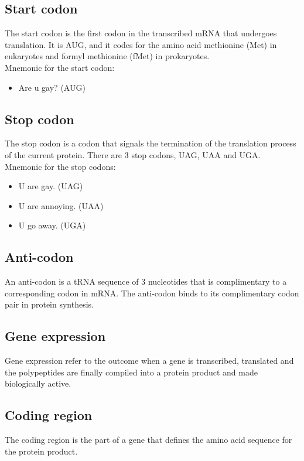 \documentclass[11pt]{article}
\begin{document}
\subsection{Start codon}
\label{sec:orga14edbb}
The start codon is the first codon in the transcribed mRNA that undergoes translation. It is AUG, and it codes for the amino acid methionine (Met) in eukaryotes and formyl methionine (fMet) in prokaryotes.
\\[0pt]

Mnemonic for the start codon:
\begin{itemize}
\item Are u gay? (AUG)
\end{itemize}

\subsection{Stop codon}
\label{sec:org535173b}
The stop codon is a codon that signals the termination of the translation process of the current protein. There are 3 stop codons, UAG, UAA and UGA.
\\[0pt]

Mnemonic for the stop codons:
\begin{itemize}
\item U are gay. (UAG)
\item U are annoying. (UAA)
\item U go away. (UGA)
\end{itemize}

\subsection{Anti-codon}
\label{sec:org271460f}
An anti-codon is a tRNA sequence of 3 nucleotides that is complimentary to a corresponding codon in mRNA. The anti-codon binds to its complimentary codon pair in protein synthesis.

\subsection{Gene expression}
\label{sec:org49a4cb6}
Gene expression refer to the outcome when a gene is transcribed, translated and the polypeptides are finally compiled into a protein product and made biologically active.

\subsection{Coding region}
\label{sec:orgade2e75}
The coding region is the part of a gene that defines the amino acid sequence for the protein product.
\\[0pt]
\end{document}
